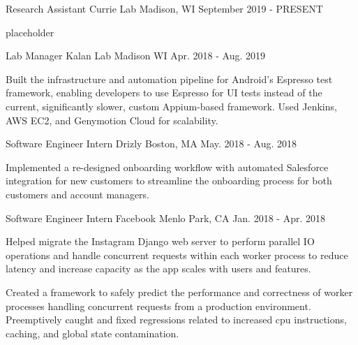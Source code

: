 
\begin{cventries}
  \cventry
    {Research Assistant} %
    {Currie Lab} %
    {Madison, WI} %
    {September 2019 - PRESENT} %
    {
      \begin{cvitems} %
        \item {placeholder}
      \end{cvitems}
    }

  \cventry
    {Lab Manager} %
    {Kalan Lab} %
    {Madison WI} %
    {Apr. 2018 - Aug. 2019} %
    {
      \begin{cvitems} %
        \item {Built the infrastructure and automation pipeline for Android's Espresso test framework, enabling developers to use Espresso for UI tests instead of the current, significantly slower, custom Appium-based framework. Used Jenkins, AWS EC2, and Genymotion Cloud for scalability.}
      \end{cvitems}
    }

  \cventry
    {Software Engineer Intern} %
    {Drizly} %
    {Boston, MA} %
    {May. 2018 - Aug. 2018} %
    {
      \begin{cvitems} %
        \item {Implemented a re-designed onboarding workflow with automated Salesforce integration for new customers to streamline the onboarding process for both customers and account managers.}
      \end{cvitems}
    }

  \cventry
    {Software Engineer Intern} %
    {Facebook} %
    {Menlo Park, CA} %
    {Jan. 2018 - Apr. 2018} %
    {
      \begin{cvitems} %
        \item {Helped migrate the Instagram Django web server to perform parallel IO operations and handle concurrent requests within each worker process to reduce latency and increase capacity as the app scales with users and features.}
		\item {Created a framework to safely predict the performance and correctness of worker processes handling concurrent requests from a production environment. Preemptively caught and fixed regressions related to increased cpu instructions, caching, and global state contamination.}
      \end{cvitems}
    }


\end{cventries}
